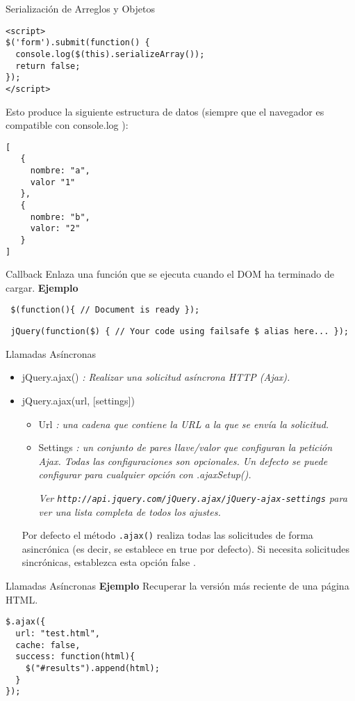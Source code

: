 \begin{frame}[fragile]{Serialización de Arreglos y Objetos} %
\begin{lstlisting}
<script>
$('form').submit(function() {
  console.log($(this).serializeArray());
  return false;
});
</script>
\end{lstlisting}
Esto produce la siguiente estructura de datos (siempre que el navegador es compatible con console.log ):
\begin{lstlisting}
[
   {
     nombre: "a",
     valor "1"
   },
   {
     nombre: "b",
     valor: "2"
   }
]
\end{lstlisting}
\end{frame}

\begin{frame}[fragile]{Callback} %
Enlaza una función que se ejecuta cuando el DOM ha terminado de cargar.
\textbf{Ejemplo}
\begin{lstlisting}
 $(function(){ // Document is ready }); 
\end{lstlisting}
\begin{lstlisting}
 jQuery(function($) { // Your code using failsafe $ alias here... }); 
\end{lstlisting}
\end{frame}

\begin{frame}[fragile]{Llamadas Asíncronas} %
\begin{itemize}
\item jQuery.ajax() \textit{ : Realizar una solicitud asíncrona HTTP (Ajax).}
\item jQuery.ajax(url, [settings]) 
\begin{itemize}
\item Url \textit{ : una cadena que contiene la URL a la que se envía la solicitud.}
\item Settings \textit{ : un conjunto de pares llave/valor que configuran la
petición Ajax. Todas las configuraciones son opcionales. Un defecto se puede
configurar para cualquier opción con .ajaxSetup().}

\textit{Ver \texttt{http://api.jquery.com/jQuery.ajax/jQuery-ajax-settings} para ver una lista completa de todos los ajustes.}
\end{itemize}
Por defecto el método \texttt{.ajax()} realiza todas las solicitudes de forma asincrónica (es decir, se establece en true por defecto). Si necesita solicitudes sincrónicas, establezca esta opción false .  
\end{itemize}
\end{frame}

\begin{frame}[fragile]{Llamadas Asíncronas} %
\textbf{Ejemplo}
Recuperar la versión más reciente de una página HTML.
\begin{lstlisting}
$.ajax({
  url: "test.html",
  cache: false,
  success: function(html){
    $("#results").append(html);
  }
});
\end{lstlisting}
\end{frame}


